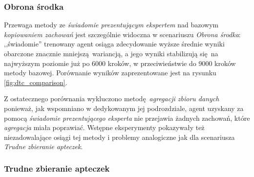 \subsubsection{Obrona środka}

Przewaga metody ze \textit{świadomie prezentującym ekspertem} nad bazowym \textit{kopiowaniem zachowań} jest szczególnie widoczna w scenariuszu \textit{Obrona środka}: ,,świadomie'' trenowany agent osiąga zdecydowanie wyższe średnie wyniki obarczone znacznie mniejszą wariancją, a jego wyniki stabilizują się na najwyższym poziomie już po 6000 kroków, w przeciwieństwie do 9000 kroków metody bazowej. Porównanie wyników zaprezentowane jest na rysunku \ref{fig:dtc_comparison}.

\begin{figure}[H]
\end{figure}

Z ostatecznego porównania wykluczono metodę \textit{agregacji zbioru danych} ponieważ, jak wspomniano w dedykowanym jej podrozdziale, agent uzyskany za pomocą \textit{świadomie prezentującego eksperta} nie przejawia żadnych zachowań, które \textit{agregacja} miała poprawiać. Wstępne eksperymenty pokazywały też niezadowalające osiągi tej metody i problemy analogiczne jak dla scenariusza \textit{Trudne zbieranie apteczek}.


\subsubsection{Trudne zbieranie apteczek}

